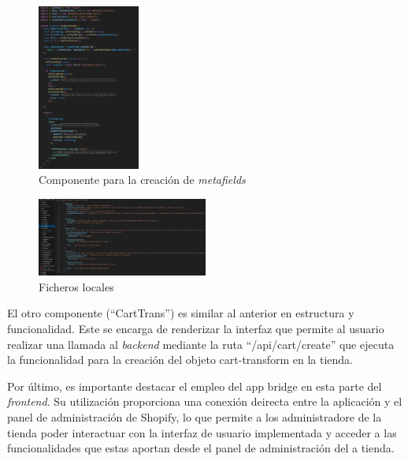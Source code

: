 \documentclass[11pt]{article}
\begin{document}
\begin{figure}[H]
    \centering
    \includegraphics[width=0.3\textwidth]{imagenes-admin/metafieldComponent.png}
    \caption{\label{fig:componenteMetafield} Componente para la creación de \textit{metafields} }
    \vspace{\fill}
\end{figure}


\begin{figure}[H]
    \centering
    \includegraphics[width=0.5\textwidth]{imagenes-admin/locales-admin.png}
    \caption{\label{fig:localesAdmin} Ficheros locales }
    \vspace{\fill}
\end{figure}

El otro componente (``CartTrans'') es similar al anterior en estructura y funcionalidad. Este se encarga de renderizar la interfaz que permite al usuario realizar una llamada al \textit{backend} mediante
la ruta ``/api/cart/create'' que ejecuta la funcionalidad para la creación del objeto cart-transform en la tienda.

Por último, es importante destacar el empleo del app bridge en esta parte del \textit{frontend}. Su utilización proporciona una conexión deirecta entre la aplicación y el panel 
de administración de Shopify, lo que permite a los administradore de la tienda poder interactuar con la interfaz de usuario implementada y acceder a las funcionalidades que estas aportan
desde el panel de administración del a tienda.
\end{document}
